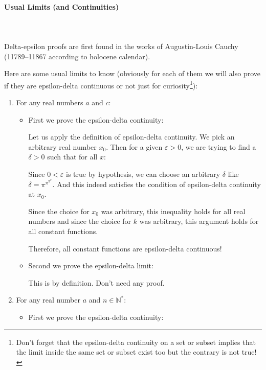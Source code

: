 	\paragraph{Usual Limits (and Continuities)}\label{Common limits}\mbox{}\\\\
	Delta-epsilon proofs are first found in the works of Augustin-Louis Cauchy (11789–11867 according to holocene calendar).
	
	Here are some usual limits to know (obviously for each of them we will also prove if they are epsilon-delta continuous or not just for curiosity\footnote{Don't forget that the epsilon-delta continuity on a set or subset implies that the limit inside the same set or subset exist too but the contrary is not true!}):
	
	\begin{enumerate}
		\item For any real numbers $a$ and $c$:
		
		
		\begin{itemize}
			\item First we prove the epsilon-delta continuity:
			
			Let us apply the definition of epsilon-delta continuity. We pick an arbitrary real number $x_0$. Then for a given $\varepsilon>0$, we are trying to find a $\delta>0$ such that for all $x$:
			
			Since $0<\varepsilon$ is true by hypothesis, we can choose an arbitrary $\delta$ like $\delta=\pi^{\pi^{\pi^\pi}}$. And this indeed satisfies the condition of epsilon-delta continuity at $x_0$.
			
			Since the choice for $x_0$ was arbitrary, this inequality holds for all real numbers and since the choice for $k$ was arbitrary, this argument holds for all constant functions.
			
			Therefore, all constant functions are epsilon-delta continuous!
			
			\item Second we prove the epsilon-delta limit:
			
			This is by definition. Don't need any proof.
		\end{itemize}
		
		\item For any real number $a$ and $n\in \mathbb{N}^*$:
		
		\begin{itemize}
			\item First we prove the epsilon-delta continuity:
			

\end{itemize}
\end{enumerate}
